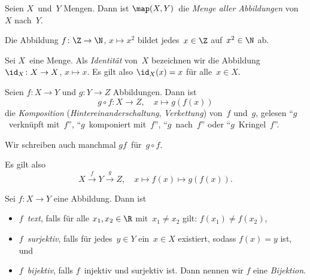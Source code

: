 \documentclass[a4paper]{article}
\begin{document}
\begin{definition}
    Seien $X$~und~$Y$ Mengen. Dann ist $\map(X, Y)$~die \emph{Menge aller Abbildungen} von~$X$ nach~$Y$.
\end{definition}

\begin{example}
    Die Abbildung $f\colon \Z \to \N$, $x \mapsto x^2$ bildet jedes~$x \in \Z$ auf~$x^2 \in \N$ ab.
\end{example}

\begin{definition}[Identität]
    Sei $X$~eine Menge. Als \emph{Identität} von~$X$ bezeichnen wir die Abbildung~$\id_X\colon X \to X$, $x \mapsto x$. Es gilt also $\id_X(x) = x$ für alle~$x \in X$.
\end{definition}

\begin{definition}
    Seien $f\colon X \to Y$ und $g\colon Y \to Z$ Abbildungen. Dann ist
    \begin{equation*}
        g \circ f\colon X \to Z,\quad x \mapsto g(f(x))
    \end{equation*}
    die \emph{Komposition} (\emph{Hintereinanderschaltung}, \emph{Verkettung}) von~$f$ und~$g$, gelesen "`$g$~verknüpft mit~$f$"', "`$g$~komponiert mit~$f$"', "`$g$~nach~$f$"' oder "`$g$~Kringel~$f$"'.
\end{definition}

\begin{notation}
    Wir schreiben auch manchmal $gf$~für~$g \circ f$.
\end{notation}

Es gilt also
\begin{equation*}
    X \overset{f}{\longrightarrow} Y \overset{g}{\longrightarrow} Z,\quad x \mapsto f(x) \mapsto g(f(x)).
\end{equation*}

\begin{definition}
    Sei $f\colon X \to Y$ eine Abbildung. Dann ist
    \begin{itemize}
        \item $f$~\emph{text}, falls für alle $x_1, x_2 \in \R$ mit~$x_1 \neq x_2$ gilt: $f(x_1) \neq f(x_2)$,
        \item $f$~\emph{surjektiv}, falls für jedes~$y \in Y$ ein~$x \in X$ existiert, sodass $f(x) = y$ ist, und
        \item $f$~\emph{bijektiv}, falls $f$~injektiv und surjektiv ist. Dann nennen wir $f$ eine \emph{Bijektion}.
    \end{itemize}
\end{definition}
\end{document}
